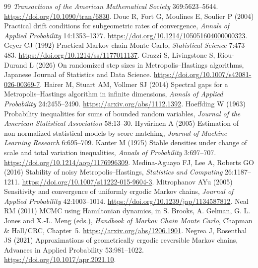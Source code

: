 \documentclass[pdflatex,iicol,sn-mathphys-ay]{sn-jnl}
\theoremstyle{definition}\newtheorem{definition}[theorem]{Definition}
\theoremstyle{remark}\newtheorem{remark}[theorem]{Remark}
\numberwithin{equation}{section}
\newcommand{\1}{\mathbf 1}
\begin{document}
\begin{thebibliography}{99}
\emph{Transactions of the American Mathematical Society} 369:5623--5644. \url{https://doi.org/10.1090/tran/6830}.
 Douc R, Fort G, Moulines E, Soulier P (2004) Practical drift conditions for subgeometric rates of convergence,
\emph{Annals of Applied Probability} 14:1353--1377. \url{https://doi.org/10.1214/105051604000000323}.
 Geyer CJ (1992) Practical Markov chain Monte Carlo,
\emph{Statistical Science} 7:473--483. \url{https://doi.org/10.1214/ss/1177011137}.
 Grazzi S, Livingstone S, Riou-Durand L (2026) On randomized step sizes in Metropolis--Hastings algorithms, Japanese Journal of Statistics and Data Science. \url{https://doi.org/10.1007/s42081-026-00369-7}.
 Hairer M, Stuart AM, Vollmer SJ (2014) Spectral gaps for a Metropolis--Hastings algorithm in infinite dimensions,
\emph{Annals of Applied Probability} 24:2455--2490. \url{https://arxiv.org/abs/1112.1392}.
 Hoeffding W (1963) Probability inequalities for sums of bounded random variables,
\emph{Journal of the American Statistical Association} 58:13--30.
 Hyv\"arinen A (2005) Estimation of non-normalized statistical models by score matching,
\emph{Journal of Machine Learning Research} 6:695--709.
 Kanter M (1975) Stable densities under change of scale and total variation inequalities,
\emph{Annals of Probability} 3:697--707. \url{https://doi.org/10.1214/aop/1176996309}.
 Medina-Aguayo FJ, Lee A, Roberts GO (2016) Stability of noisy Metropolis--Hastings, \emph{Statistics and Computing} 26:1187--1211. \url{https://doi.org/10.1007/s11222-015-9604-3}.
 Mitrophanov AYu (2005) Sensitivity and convergence of uniformly ergodic Markov chains, \emph{Journal of Applied Probability} 42:1003--1014. \url{https://doi.org/10.1239/jap/1134587812}.
 Neal RM (2011) MCMC using Hamiltonian dynamics, in S. Brooks, A. Gelman, G. L. Jones and X.-L. Meng (eds.), \emph{Handbook of Markov Chain Monte Carlo}, Chapman \& Hall/CRC, Chapter~5. \url{https://arxiv.org/abs/1206.1901}.
 Negrea J, Rosenthal JS (2021) Approximations of geometrically ergodic reversible Markov chains, Advances in Applied Probability 53:981--1022. \url{https://doi.org/10.1017/apr.2021.10}.

\end{thebibliography}
\end{document}
